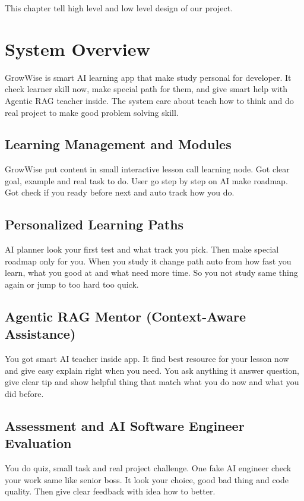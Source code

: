 \documentclass{FastFyp}
\begin{document}
This chapter tell high level and low level design of our project.

\section{System Overview}

GrowWise is smart AI learning app that make study personal for developer. It check learner skill now, make special path for them, and give smart help with Agentic RAG teacher inside. The system care about teach how to think and do real project to make good problem solving skill.

\subsection{Learning Management and Modules}

GrowWise put content in small interactive lesson call learning node. Got clear goal, example and real task to do. User go step by step on AI make roadmap. Got check if you ready before next and auto track how you do.

\subsection{Personalized Learning Paths}

AI planner look your first test and what track you pick. Then make special roadmap only for you. When you study it change path auto from how fast you learn, what you good at and what need more time. So you not study same thing again or jump to too hard too quick.

\subsection{Agentic RAG Mentor (Context-Aware Assistance)}

You got smart AI teacher inside app. It find best resource for your lesson now and give easy explain right when you need. You ask anything it answer question, give clear tip and show helpful thing that match what you do now and what you did before.

\subsection{Assessment and AI Software Engineer Evaluation}

You do quiz, small task and real project challenge. One fake AI engineer check your work same like senior boss. It look your choice, good bad thing and code quality. Then give clear feedback with idea how to better.
\end{document}
